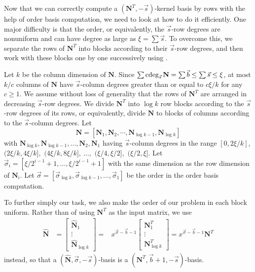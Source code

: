 Now that we can correctly compute a $\left(\mathbf{N}^{T},-\vec{s}\right)$-kernel
basis by rows with the help of order basis computation, we need to
look at how to do it efficiently. One major difficulty is that the
order, or equivalently, the $\vec{s}$-row degrees are nonuniform
and can have degree as large as $\xi=\sum\vec{s}$. To overcome this,
we separate the rows of $\mathbf{N}^{T}$ into blocks according to
their $\vec{s}$-row degrees, and then work with these blocks one
by one successively using . 



Let $k$ be the column dimension of $\mathbf{N}$. Since $\sum\cdeg_{\vec{s}}\mathbf{N}=\sum\vec{b}\le\sum\vec{s}\le\xi$,
at most $k/c$ columns of $\mathbf{N}$ have $\vec{s}$-column degrees
greater than or equal to $c\xi/k$ for any $c\ge1$. We assume without
loss of generality that the rows of $\mathbf{N}^{T}$ are arranged
in decreasing $\vec{s}$-row degrees. We divide $\mathbf{N}^{T}$
into $\log k$ row blocks according to the $\vec{s}$-row degrees
of its rows, or equivalently, divide $\mathbf{N}$ to blocks of columns
according to the $\vec{s}$-column degrees. Let 
\[
\mathbf{N}=\left[\mathbf{N}_{1},\mathbf{N}_{2},\cdots,\mathbf{N}_{\log k-1},\mathbf{N}_{\log k}\right]
\]
with $\mathbf{N}_{\log k},\mathbf{N}_{\log k-1},\dots,\mathbf{N}_{2},\mathbf{N}_{1}$
having $\vec{s}$-column degrees in the range $\left[0,2\xi/k\right]$,
$(2\xi/k,4\xi/k],$ $(4\xi/k,8\xi/k],\ ...,$ $(\xi/4,\xi/2],$ $(\xi/2,\xi].$
Let $\vec{\sigma}_{i}=\left[\xi/2^{i-1}+1,\dots,\xi/2^{i-1}+1\right]$
with the same dimension as the row dimension of $\mathbf{N}_{i}$.
Let $\vec{\sigma}=\left[\vec{\sigma}_{\log k},\vec{\sigma}_{\log k-1},\dots,\vec{\sigma}_{1}\right]$
be the order in the order basis computation.

To further simply our task, we also make the order of our problem
in each block uniform. Rather than of using $\mathbf{N}^{T}$ as the
input matrix, we use 
\begin{eqnarray*}
\hat{\mathbf{N}} & =\begin{bmatrix}\hat{\mathbf{N}}_{1}\\
\vdots\\
\hat{\mathbf{N}}_{\log k}
\end{bmatrix}= & x^{\vec{\sigma}-\vec{b}-1}\begin{bmatrix}\mathbf{N}_{1}^{T}\\
\vdots\\
\mathbf{N}_{\log k}^{T}
\end{bmatrix}=x^{\vec{\sigma}-\vec{b}-1}\mathbf{N}^{T}
\end{eqnarray*}
 instead, so that a $\left(\hat{\mathbf{N}},\vec{\sigma},-\vec{s}\right)$-basis
is a $\left(\mathbf{N}^{T},\vec{b}+1,-\vec{s}\right)$-basis.

